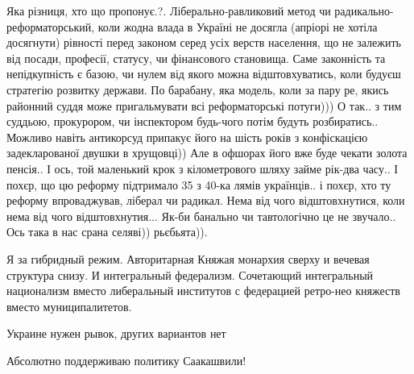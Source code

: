 \begin{itemize}

Яка різниця, хто що пропонує.?. Ліберально-равликовий метод чи
радикально-реформаторський, коли жодна влада в Україні не досягла (апріорі не
хотіла досягнути) рівності перед законом серед усіх верств населення, що не
залежить від посади, професії, статусу, чи фінансового становища. Саме
законність та непідкупність є базою, чи нулем від якого можна відштовхуватись,
коли будуєш стратегію розвитку держави. По барабану, яка модель, коли за пару
ре, якись районний суддя може пригальмувати всі реформаторські потуги))) О
так.. з тим суддьою, прокурором, чи інспектором будь-чого потім будуть
розбиратись.. Можливо навіть антикорсуд припакує його на шість років з
конфіскацією задекларованої двушки в хрущовці)) Але в офшорах його вже буде
чекати золота пенсія.. І ось, той маленький крок з кілометрового шляху займе
рік-два часу.. І похєр, що цю реформу підтримало 35 з 40-ка лямів українців.. і
похєр, хто ту реформу впроваджував, ліберал чи радикал. Нема від чого
відштовхнутися, коли нема від чого відштовхнутия... Як-би банально чи
тавтологічно це не звучало.. Ось така в нас срана селяві)) рьєбьята)).


Я за гибридный режим. Авторитарная Княжая монархия сверху и вечевая структура снизу. И интегральный федерализм. Сочетающий интегральный национализм вместо либеральный институтов с федерацией ретро-нео княжеств вместо муниципалитетов.


Украине нужен рывок, других вариантов нет


Абсолютно поддерживаю политику Саакашвили!

\end{itemize}
